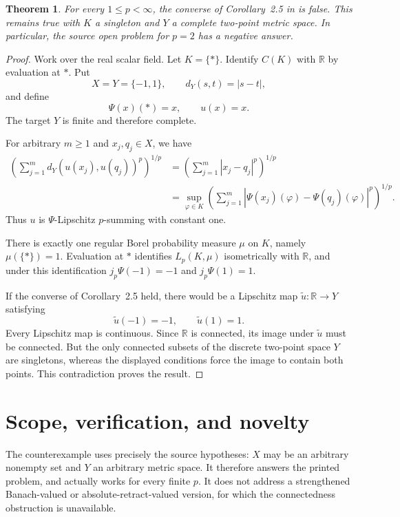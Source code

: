 \documentclass[10pt]{article}
\newtheorem{theorem}{Theorem}
\newcommand{\R}{\mathbb R}
\begin{document}
\begin{theorem}\label{thm:main}
For every $1\leq p<\infty$, the converse of Corollary~2.5 in
\cite{source} is false. This remains true with $K$ a singleton and $Y$ a
complete two-point metric space. In particular, the source open problem for
$p=2$ has a negative answer.
\end{theorem}

\begin{proof}
Work over the real scalar field. Let $K=\{\ast\}$. Identify $C(K)$ with
$\R$ by evaluation at $\ast$. Put
\[
 X=Y=\{-1,1\},\qquad d_Y(s,t)=|s-t|,
\]
and define
\[
 \Psi(x)(\ast)=x,\qquad u(x)=x.
\]
The target $Y$ is finite and therefore complete.

For arbitrary $m\geq1$ and $x_j,q_j\in X$, we have
\begin{align*}
 \left(\sum_{j=1}^m d_Y(u(x_j),u(q_j))^p\right)^{1/p}
 &=\left(\sum_{j=1}^m|x_j-q_j|^p\right)^{1/p}\\
 &=\sup_{\varphi\in K}
 \left(\sum_{j=1}^m
 |\Psi(x_j)(\varphi)-\Psi(q_j)(\varphi)|^p\right)^{1/p}.
\end{align*}
Thus $u$ is $\Psi$-Lipschitz $p$-summing with constant one.

There is exactly one regular Borel probability measure $\mu$ on $K$, namely
$\mu(\{\ast\})=1$. Evaluation at $\ast$ identifies $L_p(K,\mu)$ isometrically
with $\R$, and under this identification $j_p\Psi(-1)=-1$ and
$j_p\Psi(1)=1$.

If the converse of Corollary~2.5 held, there would be a Lipschitz map
$\widetilde u:\R\to Y$ satisfying
\[
 \widetilde u(-1)=-1,\qquad \widetilde u(1)=1.
\]
Every Lipschitz map is continuous. Since $\R$ is connected, its image under
$\widetilde u$ must be connected. But the only connected subsets of the
discrete two-point space $Y$ are singletons, whereas the displayed conditions
force the image to contain both points. This contradiction proves the result.
\end{proof}

\section{Scope, verification, and novelty}

The counterexample uses precisely the source hypotheses: $X$ may be an
arbitrary nonempty set and $Y$ an arbitrary metric space. It therefore answers
the printed problem, and actually works for every finite $p$. It does not
address a strengthened Banach-valued or absolute-retract-valued version, for
which the connectedness obstruction is unavailable.
\end{document}
